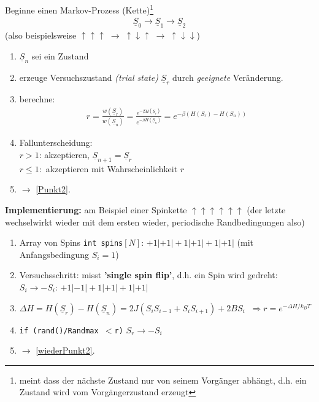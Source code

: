 \documentclass[12pt]{article}
\begin{document}
Beginne einen Markov-Prozess (Kette)\footnote{meint dass der nächste Zustand nur von seinem Vorgänger abhängt, d.h. ein Zustand wird vom Vorgängerzustand erzeugt} 
\begin{align*}
\underline{S}_0 \rightarrow \underline{S}_1 \rightarrow \underline{S}_2
\end{align*}
(also beispielsweise $\uparrow \uparrow \uparrow \; \rightarrow \; \uparrow \downarrow \uparrow \; \rightarrow \; \uparrow \downarrow \downarrow$)

\begin{enumerate}
\item $\underline{S}_n $ sei ein Zustand
\item \label{Punkt2} erzeuge Versuchszustand \textit{(trial state)} $\underline{S}_r$ durch \textit{geeignete} Veränderung.
\item berechne: 
\begin{align}
r= \frac{w(\underline{S}_r)}{w(\underline{S}_n)} = \frac{e^{- \beta H(\underline{S}_r )}}{e^{- \beta H(\underline{S}_n )}}= e^{-\beta (H(S_r)-H(S_n))}
\end{align}

\item Fallunterscheidung: \\ 
$r>1$: akzeptieren, $\underline{S}_{n+1} = \underline{S}_r$\\
$r \leq 1:$ akzeptieren mit Wahrscheinlichkeit $r$
\item  $\rightarrow$ \ref{Punkt2}.
\end{enumerate}
\textbf{Implementierung:} am Beispiel einer Spinkette $\uparrow \uparrow \uparrow \uparrow \uparrow \uparrow$ (der letzte wechselwirkt wieder mit dem ersten wieder, periodische Randbedingungen also)

\begin{enumerate}
\item Array von Spins \texttt{int spins}$[N]$: $ +1|+1|+1|+1|+1|+1|$ (mit Anfangsbedingung $S_i =1$)
\item \label{wiederPunkt2} Versuchsschritt: misst \textbf{'single spin flip'}, d.h. ein Spin wird gedreht: \\
$S_i \rightarrow - S_i$: $ +1|-1|+1|+1|+1|+1|$
\item $\Delta H= H(\underline{S}_r)  - H(\underline{S}_n) = 2 J (S_i S_{i-1} + S_i S_{i+1}) + 2BS_i \; \; \Rightarrow r= e^{-\Delta H / k_BT}$
\item \texttt{if (rand()/Randmax $<$r)} $S_r \rightarrow -S_i$
\item $\rightarrow$ \ref{wiederPunkt2}.
\end{enumerate}
\end{document}
